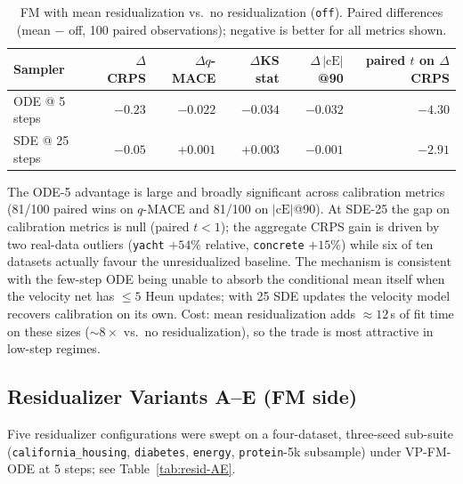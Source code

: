 \documentclass{tpm2026}
\begin{document}
\begin{table}[!h]
  \centering
  \caption{FM with mean residualization vs.\ no residualization (\texttt{off}). Paired differences (mean $-$ off, 100 paired observations); negative is better for all metrics shown.}\label{tab:off-vs-mean}
  \footnotesize
  \begin{tabular}{lrrrrr}
    \toprule
    Sampler & $\Delta$CRPS & $\Delta q$-MACE & $\Delta$KS stat & $\Delta\,|\text{cE}|$@90 & paired $t$ on $\Delta$CRPS \\
    \midrule
    ODE @ 5 steps  & $-0.23$ & $-0.022$ & $-0.034$ & $-0.032$ & $-4.30$ \\
    SDE @ 25 steps & $-0.05$ & $+0.001$ & $+0.003$ & $-0.001$ & $-2.91$ \\
    \bottomrule
  \end{tabular}
\end{table}

The ODE-5 advantage is large and broadly significant across calibration metrics (81/100 paired wins on $q$-MACE and 81/100 on $|\text{cE}|$@90). At SDE-25 the gap on calibration metrics is null (paired $t<1$); the aggregate CRPS gain is driven by two real-data outliers (\texttt{yacht} $+54\%$ relative, \texttt{concrete} $+15\%$) while six of ten datasets actually favour the unresidualized baseline. The mechanism is consistent with the few-step ODE being unable to absorb the conditional mean itself when the velocity net has $\leq 5$ Heun updates; with 25 SDE updates the velocity model recovers calibration on its own. Cost: mean residualization adds $\approx 12$\,s of fit time on these sizes ($\sim 8\times$ vs.\ no residualization), so the trade is most attractive in low-step regimes.

\subsection{Residualizer Variants A--E (FM side)}\label{app:resid-AE}

Five residualizer configurations were swept on a four-dataset, three-seed sub-suite (\texttt{california\_housing}, \texttt{diabetes}, \texttt{energy}, \texttt{protein}-5k subsample) under VP-FM-ODE at 5 steps; see Table~\ref{tab:resid-AE}.
\end{document}
